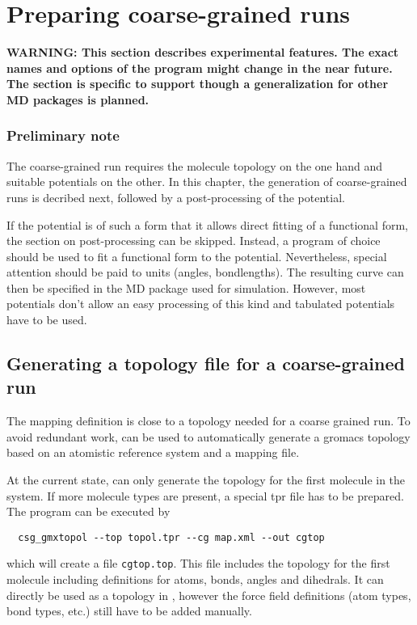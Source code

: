 \chapter{Preparing coarse-grained runs}
\label{sec:usage:cgrun}
\textbf{WARNING: This section describes experimental features. The exact names and options of the program might change in the near future.  The section is specific to \gromacs support though a generalization for other MD packages is planned.}

\subsection*{Preliminary note}
The coarse-grained run requires the molecule topology on the one hand and suitable potentials on the other. In this chapter, the generation of coarse-grained runs is decribed next, followed by a post-processing of the potential.

If the potential is of such a form that it allows direct fitting of a functional form, the section on post-processing can be skipped. Instead, a program of choice should be used to fit a functional form to the potential. Nevertheless, special attention should be paid to units (angles, bondlengths). The resulting curve can then be specified in the MD package used for simulation. However, most potentials don't allow an easy processing of this kind and tabulated potentials have to be used.

\section{Generating a topology file for a coarse-grained run}
The mapping definition is close to a topology needed for a coarse grained run. To avoid redundant work,  can be used to automatically generate a gromacs topology based on an atomistic reference system and a mapping file.

At the current state,  can only generate the topology for the first molecule in the system. If more molecule types are present, a special tpr file has to be prepared. The program can be executed by
\begin{verbatim}
  csg_gmxtopol --top topol.tpr --cg map.xml --out cgtop
\end{verbatim}
which will create a file \texttt{cgtop.top}. This file includes the topology for the first molecule including definitions for atoms, bonds, angles and dihedrals. It can directly be used as a topology in \gromacs, however the force field definitions (atom types, bond types, etc.) still have to be added manually.


